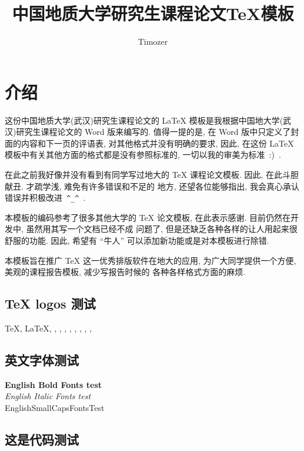 \documentclass{cugrep}
\title{中国地质大学研究生课程论文\TeX{}模板}
\author{Timozer}
\begin{document}
\maketitle

\frontmatter
{}
\makeabstract 

\tableofcontents
\clearpage

\mainmatter
\chapter{介绍}
这份中国地质大学(武汉)研究生课程论文的 \LaTeX{} 模板是我根据中国地大学(武汉)研究生课程论文的 {\sc Word} 版来编写的. 
值得一提的是, 在 {\sc Word} 版中只定义了封面的内容和下一页的评语表, 对其他格式并没有明确的要求, 因此, 
在这份 \LaTeX{} 模板中有关其他方面的格式都是没有参照标准的, 一切以我的审美为标准~:)~.

在此之前我好像并没有看到有同学写过地大的 \TeX{} 课程论文模板. 因此, 在此斗胆献丑. 才疏学浅, 难免有许多错误和不足的
地方, 还望各位能够指出, 我会真心承认错误并积极改进~\verb|^_^|~.

本模板的编码参考了很多其他大学的 \TeX{} 论文模板, 在此表示感谢. 目前仍然在开发中, 虽然用其写一个文档已经不成
问题了, 但是还缺乏各种各样的让人用起来很舒服的功能. 因此, 希望有 ``牛人'' 可以添加新功能或是对本模板进行除错.

本模板旨在推广 \TeX{} 这一优秀排版软件在地大的应用, 为广大同学提供一个方便, 美观的课程报告模板, 减少写报告时候的
各种各样格式方面的麻烦. 

\section{\TeX{} logos 测试}
\TeX{}, \LaTeX{}, \LaTeXe{}, \XeTeX{}, \XeLaTeX{}, \LuaTeX{}, \LuaLaTeX{}, \MF{}, \MP{}, \BIBTEX, \AMSTEX

\section{英文字体测试}
{
\noindent
{\bf English Bold Fonts test} \\
{\textit{English Italic Fonts test}}\\
{\sc EnglishSmallCapsFontsTest}}

\section{这是代码测试}
\end{document}
